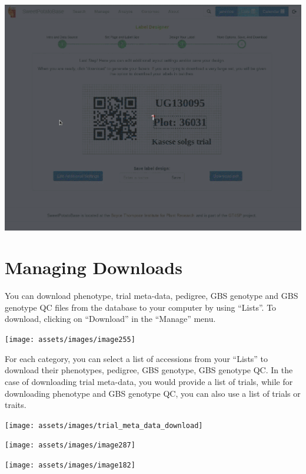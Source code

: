 \documentclass[
  12pt,
]{book}
\begin{document}
\begin{center}\includegraphics[width=0.95\linewidth]{assets/gifs/gif4} \end{center}

\hypertarget{managing-downloads}{%
\chapter{Managing Downloads}\label{managing-downloads}}

You can download phenotype, trial meta-data, pedigree, GBS genotype and GBS genotype QC files from the database to your computer by using ``Lists''. To download, clicking on ``Download'' in the ``Manage'' menu.

\begin{center}\texttt{[image: assets/images/image255]} \end{center}

For each category, you can select a list of accessions from your ``Lists'' to download their phenotypes, pedigree, GBS genotype, GBS genotype QC. In the case of downloading trial meta-data, you would provide a list of trials, while for downloading phenotype and GBS genotype QC, you can also use a list of trials or traits.

\begin{center}\texttt{[image: assets/images/trial\_meta\_data\_download]} \end{center}

\begin{center}\texttt{[image: assets/images/image287]} \end{center}

\begin{center}\texttt{[image: assets/images/image182]} \end{center}
\end{document}
